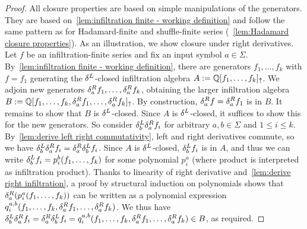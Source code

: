 \begin{proof}
    All closure properties are based on simple manipulations of the generators.
    They are based on~\cref{lem:infiltration finite - working definition}
    and follow the same pattern as for Hadamard-finite and shuffle-finite series
    (\cf~\cref{lem:Hadamard closure properties}).
    As an illustration, we show closure under right derivatives.
    Let $f$ be an infiltration-finite series and fix an input symbol $a \in \Sigma$.
    By~\cref{lem:infiltration finite - working definition},
    there are generators $f_1, \dots, f_k$ with $f = f_1$ generating the $\delta^L_{}$-closed infiltration algebra
        $A := \mathbb Q[f_1, \dots, f_k]_{\operatorname{\uparrow}}$.
    We adjoin new generators $\delta^R_{a} f_1, \dots, \delta^R_{a} f_k$,
    obtaining the larger infiltration algebra
        $B := \mathbb Q[f_1, \dots, f_k, \delta^R_{a} f_1, \dots, \delta^R_{a} f_k]_{\operatorname{\uparrow}}$.
    By construction, $\delta^R_{a} f = \delta^R_{a} f_1$ is in $B$.
    It remains to show that $B$ is $\delta^L_{}$-closed.
    Since $A$ is $\delta^L_{}$-closed, it suffices to show this for the new generators.
    So consider $\delta^L_{b} \delta^R_{a} f_i$
    for arbitrary $a, b \in \Sigma$ and $1 \leq i \leq k$.
    By~\cref{lem:derive left right commutativity}, left and right derivatives commute,
    so we have $\delta^L_{b} \delta^R_{a} f_i = \delta^R_{a} \delta^L_{b} f_i$.
    Since $A$ is $\delta^L_{}$-closed, $\delta^L_{b} f_i$ is in $A$,
    and thus we can write $\delta^L_{b} f_i = p_i^b(f_1, \dots, f_k)$
    for some polynomial $p_i^a$ (where product is interpreted as infiltration product).
    Thanks to linearity of right derivative and~\cref{lem:derive right infiltration},
    a proof by structural induction on polynomials
    shows that $\delta^R_{a} (p_i^a(f_1, \dots, f_k))$ can be written as a polynomial expression
    $q_i^{a, b}(f_1, \dots, f_k, \delta^R_{a} f_1, \dots, \delta^R_{a} f_k)$.
    We thus have
    $\delta^L_{b} \delta^R_{a} f_i
            = \delta^R_{a} \delta^L_{b} f_i
            = q_i^{a, b}(f_1, \dots, f_k, \delta^R_{a} f_1, \dots, \delta^R_{a} f_k)
            \in B$,
    as required.
\end{proof}

